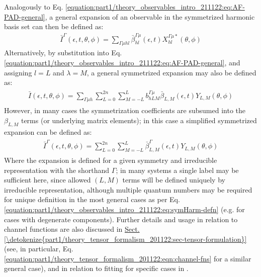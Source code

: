 \documentclass[letterpaper,table,10pt,english]{jupyterBook}
\begin{document}
\sphinxAtStartPar
Analogously to Eq. \eqref{equation:part1/theory_observables_intro_211122:eq:AF-PAD-general}, a general expansion of an observable in the symmetrized harmonic basis set can then be defined as:
\begin{equation}\label{equation:part1/theory_observables_intro_211122:eq:AF-PAD-general-symHarm}
\begin{split}
\bar{I}^{\Gamma}(\epsilon,t,\theta,\phi) = \sum_{\Gamma\mu hl}\bar{\beta}_{hl}^{\Gamma\mu}(\epsilon,t)X_{hl}^{\Gamma\mu*}(\theta,\phi)
\end{split}
\end{equation}
\sphinxAtStartPar
Alternatively, by substitution into Eq. \eqref{equation:part1/theory_observables_intro_211122:eq:AF-PAD-general}, and assigning \(l=L\) and \(\lambda=M\), a general symmetrized expansion may also be defined as:
\begin{equation}\label{equation:part1/theory_observables_intro_211122:eq:AF-PAD-general-symHarm-subs}
\begin{split}
\begin{align}
\bar{I}(\epsilon,t,\theta,\phi)=\sum_{\Gamma\mu h}\sum_{L=0}^{2n}\sum_{M=-L}^{L}b_{hLM}^{\Gamma\mu}\bar{\beta}_{L,M}(\epsilon,t)Y_{L,M}(\theta,\phi)
\end{align}
\end{split}
\end{equation}
\sphinxAtStartPar
However, in many cases the symmetrization coefficients are subsumed into the \(\beta_{L,M}\) terms (or underlying matrix elements); in this case a simplified symmetrized expansion can be defined as:
\begin{equation}\label{equation:part1/theory_observables_intro_211122:eq:AF-PAD-general-sym-betas}
\begin{split}
\begin{align}
\bar{I}^{\Gamma}(\epsilon,t,\theta,\phi)=\sum_{L=0}^{2n}\sum_{M=-L}^{L}\bar{\beta}^{\Gamma}_{L,M}(\epsilon,t)Y_{L,M}(\theta,\phi)
\end{align}
\end{split}
\end{equation}
\sphinxAtStartPar
Where the expansion is defined for a given symmetry and irreducible representation with the shorthand \(\Gamma\); in many systems a single label may be sufficient here, since allowed \((L,M)\) terms will be defined uniquely by irreducible representation, although multiple quantum numbers may be required for unique definition in the most general cases as per Eq. \eqref{equation:part1/theory_observables_intro_211122:eq:symHarm-defn} (e.g. for cases with degenerate components). Further details and usage in relation to channel functions are also discussed in \hyperref[\detokenize{part1/theory_tensor_formalism_201122:sec-tensor-formulation}]{Sect.\@ \ref{\detokenize{part1/theory_tensor_formalism_201122:sec-tensor-formulation}}} (see, in particular, Eq. \eqref{equation:part1/theory_tensor_formalism_201122:eqn:channel-fns} for a similar general case), and in relation to fitting for specific cases in .
\end{document}
